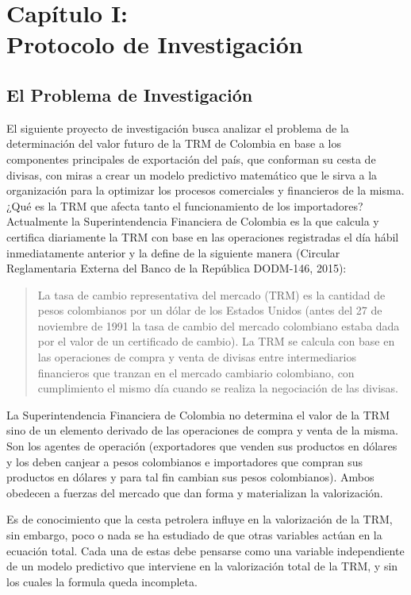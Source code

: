 \setcounter{chapter}{0}
\chapter{Capítulo I: \\Protocolo de Investigación}
\thispagestyle{empty}

\section{El Problema de Investigación}
El siguiente proyecto de investigación busca analizar el problema de la determinación del valor futuro de la TRM de Colombia en base a los componentes principales de exportación del país, que conforman su cesta de divisas, con miras a crear un modelo predictivo matemático que le sirva a la organización para la optimizar los procesos comerciales y financieros de la misma. ¿Qué es la TRM que afecta tanto el funcionamiento de los importadores? Actualmente la Superintendencia Financiera de Colombia es la que calcula y certifica diariamente la TRM con base en las operaciones registradas el día hábil inmediatamente anterior y la define de la siguiente manera (Circular Reglamentaria Externa del Banco de la República DODM-146, 2015):

\begin{quotation}
	La tasa de cambio representativa del mercado (TRM) es la cantidad de pesos colombianos por un dólar de los Estados Unidos (antes del 27 de noviembre de 1991 la tasa de cambio del mercado colombiano estaba dada por el valor de un certificado de cambio). La TRM se calcula con base en las operaciones de compra y venta de divisas entre intermediarios financieros que tranzan en el mercado cambiario colombiano, con cumplimiento el mismo día cuando se realiza la negociación de las divisas.
\end{quotation}

La Superintendencia Financiera de Colombia no determina el valor de la TRM sino de un elemento derivado de las operaciones de compra y venta de la misma. Son los agentes de operación (exportadores que venden sus productos en dólares y los deben canjear a pesos colombianos e importadores que compran sus productos en dólares y para tal fin cambian sus pesos colombianos). Ambos obedecen a fuerzas del mercado que dan forma y materializan la valorización.

Es de conocimiento que la cesta petrolera influye en la valorización de la TRM, sin embargo, poco o nada se ha estudiado de que otras variables actúan en la ecuación total. Cada una de estas debe pensarse como una variable independiente de un modelo predictivo que interviene en la valorización total de la TRM, y sin los cuales la formula queda incompleta.

